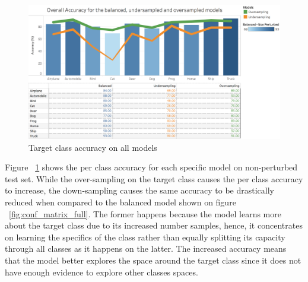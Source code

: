 \begin{figure}[!h]
	\centering
	\includegraphics[scale=0.3]{graph_non_pert.png}
	\caption{Target class accuracy on all models}
	\label{fig:acc_graph}
\end{figure}

Figure ~\ref{fig:acc_graph} shows the per class accuracy for each specific model on non-perturbed test set. While the over-sampling on the target class causes the per class accuracy to increase, the down-sampling causes the same accuracy to be drastically reduced when compared to the balanced model shown on figure ~\ref{fig:conf_matrix_full}. The former happens because the model learns more about the target class due to its increased number samples, hence, it concentrates on learning the specifics of the class rather than equally splitting its capacity through all classes as it happens on the latter. The increased accuracy means that the model better explores the space around the target class since it does not have enough evidence to explore other classes spaces.

